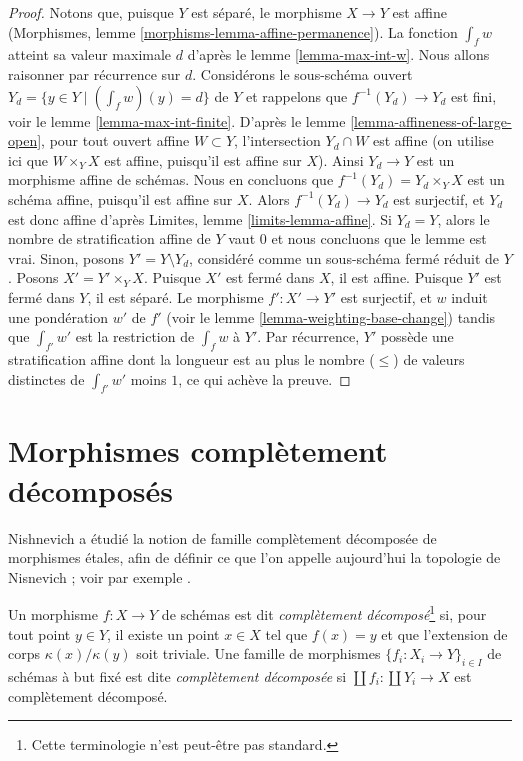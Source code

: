 \begin{proof}
Notons que, puisque $Y$ est séparé, le morphisme $X \to Y$ est affine
(Morphismes, lemme \ref{morphisms-lemma-affine-permanence}).
La fonction $\int_f w$ atteint sa valeur maximale $d$ d'après le
lemme \ref{lemma-max-int-w}. Nous allons raisonner par récurrence sur $d$.
Considérons le sous-schéma ouvert $Y_d = \{y \in Y \mid (\int_f w)(y) = d\}$
de $Y$ et rappelons que $f^{-1}(Y_d) \to Y_d$ est fini, voir le
lemme \ref{lemma-max-int-finite}.
D'après le lemme \ref{lemma-affineness-of-large-open},
pour tout ouvert affine $W \subset Y$, l'intersection $Y_d \cap W$ est affine
(on utilise ici que $W \times_Y X$ est affine, puisqu'il est affine sur $X$).
Ainsi $Y_d \to Y$ est un morphisme affine de schémas. Nous
en concluons que $f^{-1}(Y_d) = Y_d \times_Y X$ est
un schéma affine, puisqu'il est affine sur $X$.
Alors $f^{-1}(Y_d) \to Y_d$ est surjectif, et
$Y_d$ est donc affine d'après Limites, lemme \ref{limits-lemma-affine}.
Si $Y_d = Y$, alors le nombre de stratification affine de $Y$ vaut $0$
et nous concluons que le lemme est vrai. Sinon, posons
$Y' = Y \setminus Y_d$, considéré comme un sous-schéma fermé réduit de $Y$.
Posons $X' = Y' \times_Y X$.
Puisque $X'$ est fermé dans $X$, il est affine. Puisque
$Y'$ est fermé dans $Y$, il est séparé.
Le morphisme $f' : X' \to Y'$ est surjectif, et
$w$ induit une pondération $w'$ de $f'$ (voir
le lemme \ref{lemma-weighting-base-change}) tandis que
$\int_{f'} w'$ est la restriction de $\int_f w$ à $Y'$.
Par récurrence, $Y'$ possède une stratification affine dont la
longueur est au plus le nombre ($\leq$) de valeurs distinctes de
$\int_{f'} w'$ moins $1$, ce qui achève la preuve.
\end{proof}









\section{Morphismes complètement décomposés}
\label{section-completely-decomposed}

\noindent
Nishnevich a étudié la notion de famille complètement décomposée
de morphismes \'etales, afin de définir ce que l'on appelle aujourd'hui la
topologie de Nisnevich ; voir par exemple \cite{Nishnevich}.

\begin{definition}
\label{definition-cd-morphism}
Un morphisme $f : X \to Y$ de schémas est dit
{\it complètement décomposé}\footnote{Cette terminologie n'est peut-être pas standard.}
si, pour tout point $y \in Y$, il
existe un point $x \in X$ tel que $f(x) = y$ et que l'extension de corps
$\kappa(x)/\kappa(y)$ soit triviale.
Une famille de morphismes $\{f_i : X_i \to Y\}_{i \in I}$ de
schémas à but fixé est dite {\it complètement décomposée}
si $\coprod f_i : \coprod Y_i \to X$ est complètement décomposé.
\end{definition}

